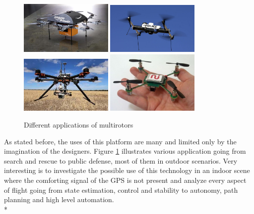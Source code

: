 \begin{figure}[h]
\centering
 \noindent
 \includegraphics[width=0.4\textwidth]{amazon.jpg}\hspace{0.1\textwidth}
 \includegraphics[width=0.4\textwidth]{police-drone.jpg}\\[2em]
 \includegraphics[width=0.4\textwidth]{gopro.jpg}\hspace{0.1\textwidth}
 \includegraphics[width=0.4\textwidth]{microcopter.jpg}\par
 \caption{Different applications of multirotors}
 \label{figure:applications}
\end{figure}

\noindent
As stated before, the uses of this platform are many and limited
only by the imagination of the designers. Figure \ref{figure:applications} illustrates various application going from search and rescue to public defense, most of them in outdoor scenarios. Very interesting is to investigate the possible use of this technology in an indoor scene where the comforting signal of the GPS is not present and analyze every aspect of flight going from state estimation, control and stability to autonomy, path planning and high level automation. \\*

